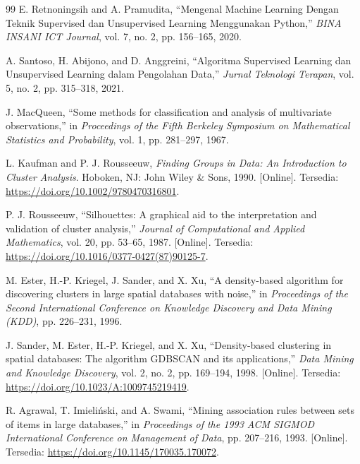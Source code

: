\documentclass[a4paper,oneside,12pt]{report}
\renewcommand{\bibname}{Daftar Pustaka}
\begin{document}
\clearpage

\renewcommand{\bibname}{Daftar Pustaka}
\begin{thebibliography}{99}
     E. Retnoningsih and A. Pramudita, ``Mengenal Machine Learning Dengan Teknik Supervised dan Unsupervised Learning Menggunakan Python,'' \textit{BINA INSANI ICT Journal}, vol. 7, no. 2, pp. 156--165, 2020.

     A. Santoso, H. Abijono, and D. Anggreini, ``Algoritma Supervised Learning dan Unsupervised Learning dalam Pengolahan Data,'' \textit{Jurnal Teknologi Terapan}, vol. 5, no. 2, pp. 315--318, 2021.

     J. MacQueen, ``Some methods for classification and analysis of multivariate observations,'' in \textit{Proceedings of the Fifth Berkeley Symposium on Mathematical Statistics and Probability}, vol. 1, pp. 281--297, 1967.

     L. Kaufman and P. J. Rousseeuw, \textit{Finding Groups in Data: An Introduction to Cluster Analysis}. Hoboken, NJ: John Wiley \& Sons, 1990. [Online]. Tersedia: \url{https://doi.org/10.1002/9780470316801}.

     P. J. Rousseeuw, ``Silhouettes: A graphical aid to the interpretation and validation of cluster analysis,'' \textit{Journal of Computational and Applied Mathematics}, vol. 20, pp. 53--65, 1987. [Online]. Tersedia: \url{https://doi.org/10.1016/0377-0427(87)90125-7}.

     M. Ester, H.-P. Kriegel, J. Sander, and X. Xu, ``A density-based algorithm for discovering clusters in large spatial databases with noise,'' in \textit{Proceedings of the Second International Conference on Knowledge Discovery and Data Mining (KDD)}, pp. 226--231, 1996.

     J. Sander, M. Ester, H.-P. Kriegel, and X. Xu, ``Density-based clustering in spatial databases: The algorithm GDBSCAN and its applications,'' \textit{Data Mining and Knowledge Discovery}, vol. 2, no. 2, pp. 169--194, 1998. [Online]. Tersedia: \url{https://doi.org/10.1023/A:1009745219419}.

     R. Agrawal, T. Imieli\'{n}ski, and A. Swami, ``Mining association rules between sets of items in large databases,'' in \textit{Proceedings of the 1993 ACM SIGMOD International Conference on Management of Data}, pp. 207--216, 1993. [Online]. Tersedia: \url{https://doi.org/10.1145/170035.170072}.


\end{thebibliography}
\end{document}
